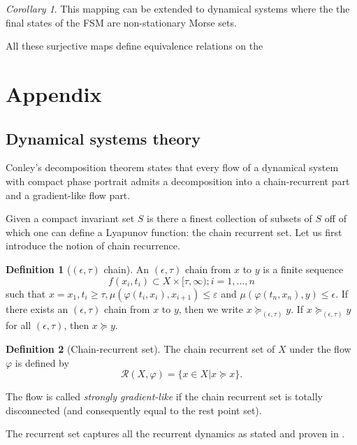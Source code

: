 \documentclass{scrartcl}
\theoremstyle{definition}
\newtheorem{definition}{Definition}
\theoremstyle{remark}
\newtheorem{corollary}[theorem]{Corollary}
\begin{document}
\begin{corollary}
This mapping can be extended to dynamical systems where the  the final states of the FSM are non-stationary Morse sets.
\end{corollary}

All these surjective maps define equivalence relations on the 

\section{Appendix}
\subsection{Dynamical systems theory}\label{sec:dst}

Conley's decomposition theorem states that every flow of a dynamical system with compact phase portrait admits a decomposition into a chain-recurrent part and a gradient-like flow part.


Given a compact invariant set $S$ is there a finest collection of subsets of $S$ off of which one can define a Lyapunov function: the chain recurrent set. Let us first introduce the notion of chain recurrence.

\begin{definition}[$(\epsilon,\tau)$ chain]
An $(\epsilon,\tau)$ chain from $x$ to $y$ is a finite sequence 
\[f(x_i, t_i) \subset  X \times  [\tau,\infty); i = 1, \dots, n\]
such that $x = x_1, t_i\geq \tau, \mu(\varphi(t_i, x_i), x_{i+1})\leq \varepsilon$   and $\mu(\varphi(t_n, x_n), y)\leq \epsilon$.
 If there exists an $(\epsilon,\tau)$ chain from $x$ to $y$, then we write $x \succeq_{(\epsilon,\tau)}y$. If  $x \succeq_{(\epsilon,\tau)}y$ for all $(\epsilon,\tau)$, then  $x \succeq y$.
\end{definition}


\begin{definition}[Chain-recurrent set]
The chain recurrent set of $X$ under the flow $\varphi$ is defined by 
\[\mathcal{R}(X,\varphi) = \{x\in X|x\succeq x\}.\]
\end{definition}

The flow is called \emph{strongly gradient-like} if the chain recurrent set is totally disconnected (and consequently equal to the rest point set). 

The recurrent set captures all the recurrent dynamics as stated and proven in \citep[Chapter I.8.2]{conley1978}.
\end{document}
